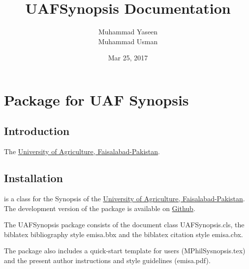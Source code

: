 \documentclass[letterpaper,10pt,english]{sphinxmanual}
\title{UAFSynopsis Documentation}
\date{Mar 25, 2017}
\author{Muhammad Yaseen\\Muhammad Usman}
\begin{document}
\maketitle
\sphinxtableofcontents
{}\label{\detokenize{index::doc}}



\chapter{ Package for UAF Synopsis}
\label{\detokenize{index:latex-package-for-uaf-synopsis}}\label{\detokenize{index:uafsynopsis-s-documentation}}

\section{Introduction}
\label{\detokenize{index:introduction}}
The \href{https://uaf.edu.pk}{University of Agriculture, Faisalabad-Pakistan}.


\section{Installation}
\label{\detokenize{index:installation}}
 is a   class for the Synopsis of the \href{https://uaf.edu.pk}{University of Agriculture, Faisalabad-Pakistan}. The development version of the package is available on \href{https://github.com/MYaseen208/UAFSynopsis}{Github}.

The UAFSynopsis  package consists of the document class UAFSynopsis.cls, the biblatex bibliography style emisa.bbx and the biblatex citation style emisa.cbx.

The package also includes a quick-start template for users (MPhilSysnopsis.tex) and the
present author instructions and style guidelines (emisa.pdf).
\end{document}
